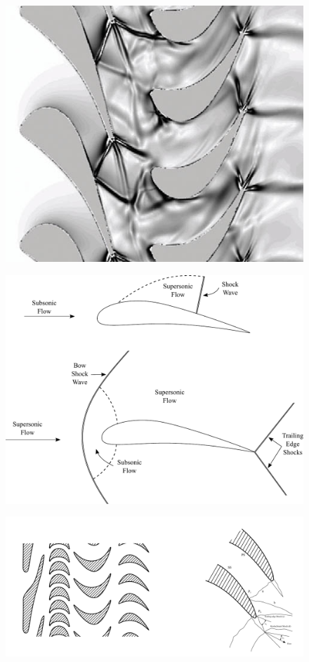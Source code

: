 \begin{figure}
\centering
\begin{minipage}{.5\textwidth}
  \centering
  \includegraphics[width=.95\linewidth]{fig/ou_schiera.png}
  \label{fig:ou_schiera}
\end{minipage}%
\begin{minipage}{.5\textwidth}
  \centering
  \includegraphics[width=.95\linewidth]{fig/SupSonic.pdf}
  \label{fig:SupSonic}
\end{minipage}
\end{figure}
\begin{figure}
\centering
  \includegraphics[width=\textwidth]{fig/PaleSup.pdf}
\caption{}
\label{fig:PaleSup}
\end{figure}

